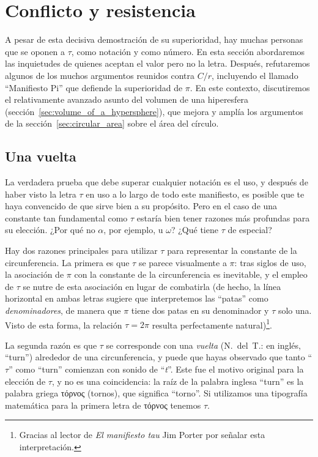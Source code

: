 

\section{Conflicto y resistencia} %
\label{sec:conflict_and_resistance}

A pesar de esta decisiva demostración de su superioridad, hay muchas personas que se oponen a $\tau$, como notación y como número. En esta sección abordaremos las inquietudes de quienes aceptan el valor pero no la letra. Después, refutaremos algunos de los muchos argumentos reunidos contra $C/r$, incluyendo el llamado ``Manifiesto Pi'' que defiende la superioridad de $\pi$. En este contexto, discutiremos el relativamente avanzado asunto del volumen de una hiperesfera (sección~\ref{sec:volume_of_a_hypersphere}), que mejora y amplía los argumentos de la sección~\ref{sec:circular_area} sobre el área del círculo.

  \subsection{Una vuelta} %
  \label{sec:one_turn}

La verdadera prueba que debe superar cualquier notación es el uso, y después de haber visto la letra $\tau$ en uso a lo largo de todo este manifiesto, es posible que te haya convencido de que sirve bien a su propósito. Pero en el caso de una constante tan fundamental como $\tau$ estaría bien tener razones más profundas para su elección. ¿Por qué no $\alpha$, por ejemplo, u $\omega$? ¿Qué tiene $\tau$ de especial?

Hay dos razones principales para utilizar $\tau$ para representar la constante de la circunferencia. La primera es que $\tau$ se parece visualmente a $\pi$: tras siglos de uso, la asociación de $\pi$ con la constante de la circunferencia es inevitable, y el empleo de $\tau$ se nutre de esta asociación en lugar de combatirla (de hecho, la línea horizontal en ambas letras sugiere que interpretemos las ``patas'' como \emph{denominadores}, de manera que $\pi$ tiene dos patas en su denominador y $\tau$ solo una. Visto de esta forma, la relación $\tau = 2\pi$ resulta perfectamente natural)\footnote{Gracias al lector de \emph{El manifiesto tau} Jim Porter por señalar esta interpretación.}.

La segunda razón es que $\tau$ se corresponde con una \emph{vuelta} (N.~del~T.: en inglés, ``turn'') alrededor de una circunferencia, y puede que hayas observado que tanto ``$\tau$'' como ``turn'' comienzan con sonido de ``\emph{t}''. Este fue el motivo original para la elección de $\tau$, y no es una coincidencia: la raíz de la palabra inglesa ``turn'' es la palabra griega τόρνος (tornos), que significa ``torno''. Si utilizamos una tipografía matemática para la primera letra de τόρνος tenemos $\tau$.

